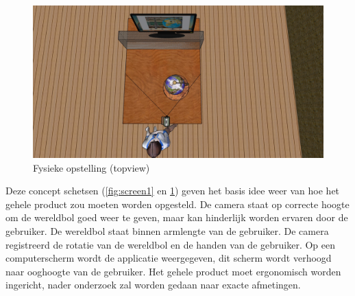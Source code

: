 \begin{figure}[h]
	\includegraphics[width=130mm]{figs/screen2.jpg}
	\caption{Fysieke opstelling (topview)}
	\label{fig:screen2}
\end{figure}

Deze concept schetsen (\cref{fig:screen1} en \cref{fig:screen2}) geven het basis idee weer van hoe het gehele product zou moeten worden opgesteld. De camera staat op correcte hoogte om de wereldbol goed weer te geven, maar kan hinderlijk worden ervaren door de gebruiker. De wereldbol staat binnen armlengte van de gebruiker. De camera registreerd de rotatie van de wereldbol en de handen van de gebruiker. Op een computerscherm wordt de applicatie weergegeven, dit scherm wordt verhoogd naar ooghoogte van de gebruiker. Het gehele product moet ergonomisch worden ingericht, nader onderzoek zal worden gedaan naar exacte afmetingen. 
